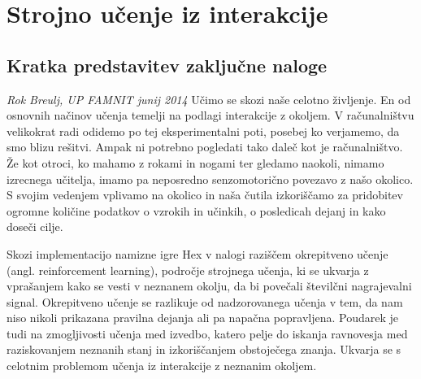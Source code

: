 \documentclass[a4paper, oneside, 12pt]{article}
\begin{document}
\section*{Strojno učenje iz interakcije}
\subsection*{Kratka predstavitev zaključne naloge}
{\em Rok Breulj, UP FAMNIT junij 2014}
\newline
\newline
Učimo se skozi naše celotno življenje. En od osnovnih načinov učenja temelji na podlagi interakcije z okoljem. V računalništvu velikokrat radi odidemo po tej eksperimentalni poti, posebej ko verjamemo, da smo blizu rešitvi. Ampak ni potrebno pogledati tako daleč kot je računalništvo. Že kot otroci, ko mahamo z rokami in nogami ter gledamo naokoli, nimamo izrecnega učitelja, imamo pa neposredno senzomotorično povezavo z našo okolico. S svojim vedenjem vplivamo na okolico in naša čutila izkoriščamo za pridobitev ogromne količine podatkov o vzrokih in učinkih, o posledicah dejanj in kako doseči cilje.

Skozi implementacijo namizne igre Hex v nalogi raziščem okrepitveno učenje (angl. reinforcement learning), področje strojnega učenja, ki se ukvarja z vprašanjem kako se vesti v neznanem okolju, da bi povečali številčni nagrajevalni signal. Okrepitveno učenje se razlikuje od nadzorovanega učenja v tem, da nam niso nikoli prikazana pravilna dejanja ali pa napačna popravljena. Poudarek je tudi na zmogljivosti učenja med izvedbo, katero pelje do iskanja ravnovesja med raziskovanjem neznanih stanj in izkoriščanjem obstoječega znanja. Ukvarja se s celotnim problemom učenja iz interakcije z neznanim okoljem.
\end{document}
